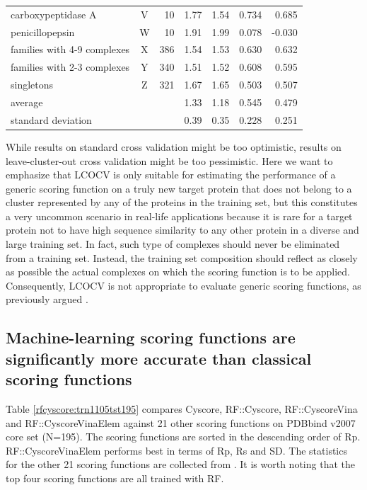 \begin{table}
\begin{tabular}{lcrrrrr}
carboxypeptidase A             & V &  10 & 1.77 & 1.54 & 0.734 & 0.685\\
penicillopepsin                & W &  10 & 1.91 & 1.99 & 0.078 &-0.030\\
families with 4-9 complexes    & X & 386 & 1.54 & 1.53 & 0.630 & 0.632\\
families with 2-3 complexes    & Y & 340 & 1.51 & 1.52 & 0.608 & 0.595\\
singletons                     & Z & 321 & 1.67 & 1.65 & 0.503 & 0.507\\
average                        &   &     & 1.33 & 1.18 & 0.545 & 0.479\\
standard deviation             &   &     & 0.39 & 0.35 & 0.228 & 0.251\\
\hline
\end{tabular}
\end{table}

While results on standard cross validation might be too optimistic, results on leave-cluster-out cross validation might be too pessimistic. Here we want to emphasize that LCOCV is only suitable for estimating the performance of a generic scoring function on a truly new target protein that does not belong to a cluster represented by any of the proteins in the training set, but this constitutes a very uncommon scenario in real-life applications because it is rare for a target protein not to have high sequence similarity to any other protein in a diverse and large training set. In fact, such type of complexes should never be eliminated from a training set. Instead, the training set composition should reflect as closely as possible the actual complexes on which the scoring function is to be applied. Consequently, LCOCV is not appropriate to evaluate generic scoring functions, as previously argued \citep{908}.

\subsection{Machine-learning scoring functions are significantly more accurate than classical scoring functions}

Table \ref{rfcyscore:trn1105tst195} compares Cyscore, RF::Cyscore, RF::CyscoreVina and RF::CyscoreVinaElem against 21 other scoring functions on PDBbind v2007 core set (N=195). The scoring functions are sorted in the descending order of Rp. RF::CyscoreVinaElem performs best in terms of Rp, Rs and SD. The statistics for the other 21 scoring functions are collected from \citep{1362,1370,1347}. It is worth noting that the top four scoring functions are all trained with RF.

